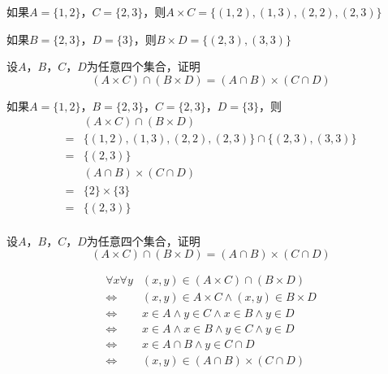 \documentclass{beamer}
\begin{document}
\begin{CJK*}{UTF8}{gbsn}
\begin{frame}
{\begin{Ex}
  如果$A=\{1,2\}$，$C=\{2,3\}$，则$A \times C = \{ (1,2), (1,3), (2,2), (2,3)\}$
  
    如果$B=\{2,3\}$，$D=\{3\}$，则$B \times D = \{ (2,3), (3,3)\}$
\end{Ex}}
\end{frame}

\begin{frame}
\begin{Exercise}
    设$A$，$B$，$C$，$D$为任意四个集合，证明
    \[(A\times C)\cap (B \times D) = (A\cap B) \times (C \cap D)\]
\end{Exercise}
 \pause
如果$A=\{1,2\}$，$B=\{2,3\}$，$C=\{2,3\}$，$D=\{3\}$，则
\begin{equation*}
  \begin{split}
      &(A\times C)\cap (B \times D)\\
  =&\{(1,2),(1,3),(2,2),(2,3)\} \cap \{(2,3),(3,3)\}\\
  =&\{(2,3)\}\\
  &(A\cap B) \times (C \cap D)\\
  =&\{2\}\times \{3\}\\
  =&\{(2,3)\}\\
  \end{split}
\end{equation*}  
\end{frame}

\begin{frame}
    \begin{Exercise}
    设$A$，$B$，$C$，$D$为任意四个集合，证明
    \[(A\times C)\cap (B \times D) = (A\cap B) \times (C \cap D)\]
\end{Exercise}
\pause
  \begin{equation*}
    \begin{split}
    \forall x \forall y&(x,y) \in (A\times C)\cap (B \times D)\\ 
    \Leftrightarrow&(x,y) \in A \times C \land (x,y) \in B \times D\\
    \Leftrightarrow&x \in A \land y \in C \land x \in B \land y \in D\\
    \Leftrightarrow&x \in A \land x \in B \land y \in C \land y \in D\\
    \Leftrightarrow&x \in A \cap B \land y \in C \cap D\\
    \Leftrightarrow&(x,y) \in (A\cap B) \times (C \cap D)
    \end{split}
  \end{equation*}

\end{frame}


\end{CJK*}
\end{document}
